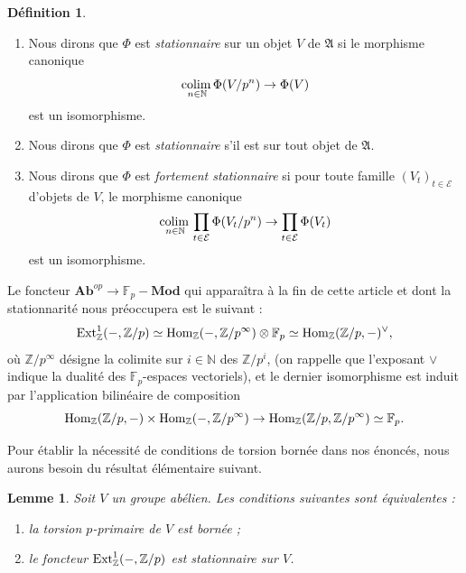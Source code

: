 \documentclass[a4paper,10pt]{article}
\newcommand{\E}{{\mathcal{E}}}
\newcommand{\col}{{\rm colim}\,}
\newtheorem{lm}[thm]{Lemme}
\theoremstyle{definition}
\newtheorem{defi}[thm]{D\'efinition}
\theoremstyle{remark}
\begin{document}
\begin{defi}\label{dfst}
 \begin{enumerate}
\item Nous dirons que $\Phi$ est {\em stationnaire} sur un objet $V$ de $\mathfrak{A}$ si le morphisme canonique
$$\underset{n\in\mathbb{N}}{\col}\Phi(V/p^n)\to\Phi(V)$$
est un isomorphisme.
\item Nous dirons que $\Phi$ est {\em stationnaire} s'il est sur tout objet de $\mathfrak{A}$.
\item Nous dirons que $\Phi$ est {\em fortement stationnaire} si pour toute famille $(V_t)_{t\in\E}$ d'objets de $V$, le morphisme canonique
$$\underset{n\in\mathbb{N}}{\col}\prod_{t\in\E}\Phi(V_t/p^n)\to\prod_{t\in\E}\Phi(V_t)$$
est un isomorphisme.
 \end{enumerate}
\end{defi}

Le foncteur $\mathbf{Ab}^{op}\to\mathbb{F}_p-\mathbf{Mod}$ qui apparaîtra à la fin de cette article et dont la stationnarité nous préoccupera est le suivant : 
$${\rm Ext}^1_\mathbb{Z}(-,\mathbb{Z}/p)\simeq {\rm Hom}_\mathbb{Z}(-,\mathbb{Z}/p^\infty)\otimes\mathbb{F}_p\simeq {\rm Hom}_\mathbb{Z}(\mathbb{Z}/p,-)^\vee,$$
où $\mathbb{Z}/p^\infty$ désigne la colimite sur $i\in\mathbb{N}$ des $\mathbb{Z}/p^i$, (on rappelle que l'exposant $\vee$ indique la dualité des $\mathbb{F}_p$-espaces vectoriels), et le dernier isomorphisme est induit par l'application bilinéaire de composition
$${\rm Hom}_\mathbb{Z}(\mathbb{Z}/p,-)\times {\rm Hom}_\mathbb{Z}(-,\mathbb{Z}/p^\infty)\to {\rm Hom}_\mathbb{Z}(\mathbb{Z}/p,\mathbb{Z}/p^\infty)\simeq\mathbb{F}_p.$$

Pour établir la nécessité de conditions de torsion bornée dans nos énoncés, nous aurons besoin du résultat élémentaire suivant.

\begin{lm}\label{lmelc}
 Soit $V$ un groupe abélien. Les conditions suivantes sont équivalentes :
\begin{enumerate}
 \item la torsion $p$-primaire de $V$ est bornée ;
\item le foncteur ${\rm Ext}^1_\mathbb{Z}(-,\mathbb{Z}/p)$ est stationnaire sur $V$.
\end{enumerate}

\end{lm}
\end{document}
